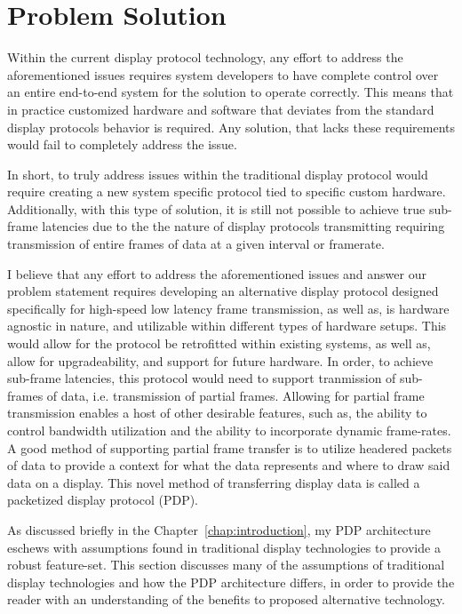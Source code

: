 \section{Problem Solution}
Within the current display protocol technology, any effort to address the aforementioned issues requires system developers to have complete control over an entire end-to-end system for the solution to operate correctly. This means that in practice customized hardware and software that deviates from the standard display protocols behavior is required. Any solution, that lacks these requirements would fail to completely address the issue.

In short, to truly address issues within the traditional display protocol would require creating a new system specific protocol tied to specific custom hardware. Additionally, with this type of solution, it is still not possible to achieve true sub-frame latencies due to the the nature of display protocols transmitting requiring transmission of entire frames of data at a given interval or framerate.

I believe that any effort to address the aforementioned issues and answer our problem statement requires developing an alternative display protocol designed specifically for high-speed low latency frame transmission, as well as, is hardware agnostic in nature, and utilizable within different types of hardware setups. This would allow for the protocol be retrofitted within existing systems, as well as, allow for upgradeability, and support for future hardware. In order, to achieve sub-frame latencies, this protocol would need to support tranmission of sub-frames of data, i.e. transmission of partial frames. Allowing for partial frame transmission enables a host of other desirable features, such as, the ability to control bandwidth utilization and the ability to incorporate dynamic frame-rates. A good method of supporting partial frame transfer is to utilize headered packets of data to provide a context for what the data represents and where to draw said data on a display. This novel method of transferring display data is called a packetized display protocol (PDP).

As discussed briefly in the Chapter~\ref{chap:introduction}, my PDP architecture eschews with assumptions found in traditional display technologies to provide a robust feature-set. This section discusses many of the assumptions of traditional display technologies and how the PDP architecture differs, in order to provide the reader with an understanding of the benefits to proposed alternative technology.

